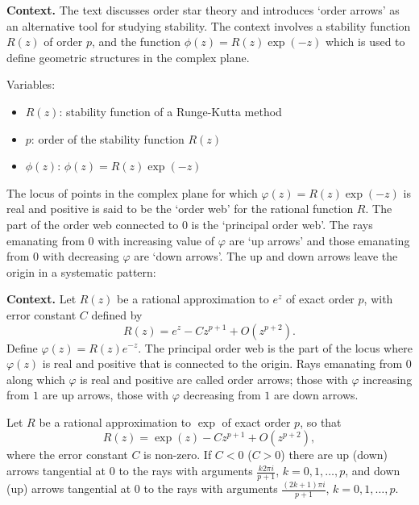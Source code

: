 \noindent\textbf{Context.}
The text discusses order star theory and introduces `order arrows' as an alternative tool for studying stability. The context involves a stability function $R(z)$ of order $p$, and the function $\phi(z) = R(z)\exp(-z)$ which is used to define geometric structures in the complex plane.

Variables:
\begin{itemize}
    \item $R(z)$: stability function of a Runge-Kutta method
    \item $p$: order of the stability function $R(z)$
    \item $\phi(z)$: $\phi(z) = R(z) \exp(-z)$
\end{itemize}

\begin{definition}

  \label{def:355A}
The locus of points in the complex plane for which $\varphi(z) = R(z) \exp(-z)$ is real and positive is said to be the `order web' for the rational function $R$. The part of the order web connected to $0$ is the `principal order web'. The rays emanating from $0$ with increasing value of $\varphi$ are `up arrows' and those emanating from $0$ with decreasing $\varphi$ are `down arrows'.
The up and down arrows leave the origin in a systematic pattern:
\end{definition}

\noindent\textbf{Context.}
Let \(R(z)\) be a rational approximation to \(e^{z}\) of exact order \(p\), with error constant \(C\) defined by
\[
R(z)=e^{z}-Cz^{p+1}+O(z^{p+2}).
\]
Define \(\varphi(z)=R(z)e^{-z}\). The principal order web is the part of the locus where \(\varphi(z)\) is real and positive that is connected to the origin. Rays emanating from \(0\) along which \(\varphi\) is real and positive are called order arrows; those with \(\varphi\) increasing from \(1\) are up arrows, those with \(\varphi\) decreasing from \(1\) are down arrows.

\begin{theorem}

  \label{thm:355B}
Let \( R \) be a rational approximation to \( \exp \) of exact order \( p \), so that
\[
R(z) = \exp(z) - C z^{p+1} + O(z^{p+2}),
\]
where the error constant \( C \) is non-zero. If \( C < 0 \) (\( C > 0 \)) there are up (down) arrows tangential at \( 0 \) to the rays with arguments \( \frac{k 2\pi i}{p + 1} \), \( k = 0, 1, \dots, p \), and down (up) arrows tangential at \( 0 \) to the rays with arguments \( \frac{(2k + 1)\pi i}{p + 1} \), \( k = 0, 1, \dots, p \).
\end{theorem}

